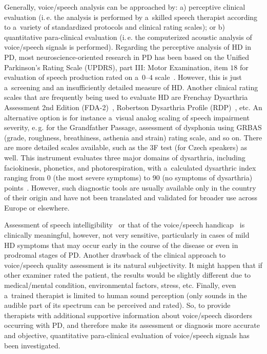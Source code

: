 Generally, voice/speech analysis can be approached by: a) perceptive clinical evaluation (i.\,e. the analysis is performed by a~skilled speech therapist according to a~variety of standardized protocols and clinical rating scales); or b) quantitative para-clinical evaluation (i.\,e. the computerized acoustic analysis of voice/speech signals is performed). Regarding the perceptive analysis of HD in PD, most neuroscience-oriented research in PD has been based on the Unified Parkinson’s Rating Scale (UPDRS), part III: Motor Examination, item $18$ for evaluation of speech production rated on a~$0$--$4$ scale~\cite{Fahn1987, Brabenec2017}. However, this is just a~screening and an insufficiently detailed measure of HD. Another clinical rating scales that are frequently being used to evaluate HD are Frenchay Dysarthria Assessment 2nd Edition (FDA-2)~\cite{Cardoso2017}, Robertson Dysarthria Profile (RDP)~\cite{Defazio2016}, etc. An alternative option is for instance a~visual analog scaling of speech impairment severity, e.\,g. for the Grandfather Passage, assessment of dysphonia using GRBAS (grade, roughness, breathiness, asthenia and strain) rating scale, and so on. There are more detailed scales available, such as the 3F test (for Czech speakers) as well. This instrument evaluates three major domains of dysarthria, including faciokinesis, phonetics, and photorespiration, with a~calculated dysarthric index ranging from $0$ (the most severe symptoms) to $90$ (no symptoms of dysarthria) points~\cite{Kostalova2013}. However, such diagnostic tools are usually available only in the country of their origin and have not been translated and validated for broader use across Europe or elsewhere.

Assessment of speech intelligibility~\cite{Yorkston1984} or that of the voice/speech handicap~\cite{Midi2008} is clinically meaningful, however, not very sensitive, particularly in cases of mild HD symptoms that may occur early in the course of the disease or even in prodromal stages of PD. Another drawback of the clinical approach to voice/speech quality assessment is its natural subjectivity. It might happen that if other examiner rated the patient, the results would be slightly different due to medical/mental condition, environmental factors, stress, etc. Finally, even a~trained therapist is limited to human sound perception (only sounds in the audible part of its spectrum can be perceived and rated). So, to provide therapists with additional supportive information about voice/speech disorders occurring with PD, and therefore make its assessment or diagnosis more accurate and objective, quantitative para-clinical evaluation of voice/speech signals has been investigated.

